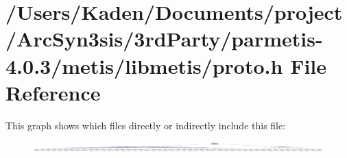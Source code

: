 \hypertarget{a00945}{}\section{/\+Users/\+Kaden/\+Documents/project/\+Arc\+Syn3sis/3rd\+Party/parmetis-\/4.0.3/metis/libmetis/proto.h File Reference}
\label{a00945}
This graph shows which files directly or indirectly include this file\+:\nopagebreak
\begin{figure}[H]
\begin{center}
\leavevmode
\includegraphics[width=350pt]{a00947}
\end{center}
\end{figure}
